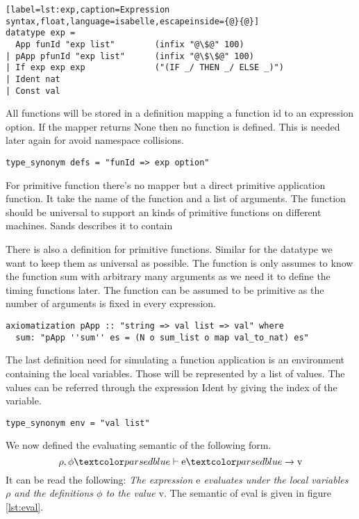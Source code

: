 \begin{lstlisting}[label=lst:exp,caption=Expression syntax,float,language=isabelle,escapeinside={@}{@}]
datatype exp =
  App funId "exp list"        (infix "@\$@" 100)
| pApp pfunId "exp list"      (infix "@\$\$@" 100)
| If exp exp exp              ("(IF _/ THEN _/ ELSE _)")
| Ident nat
| Const val
\end{lstlisting}

All functions will be stored in a definition mapping a function id to an expression option.
If the mapper returns None then no function is defined.
This is needed later again for avoid namespace collisions.
\begin{lstlisting}[mathescape=true,language=isabelle]
type_synonym defs = "funId => exp option"
\end{lstlisting}

For primitive function there's no mapper but a direct primitive application function.
It take the name of the function and a list of arguments.
The function should be universal to support an kinds of primitive functions on different machines.
Sands describes it to contain

There is also a definition for primitive functions.
Similar for the datatype we want to keep them as universal as possible.
The function is only assumes to know the function sum with arbitrary many arguments as we need it to define
the timing functions later.
The function can be assumed to be primitive as the number of arguments is fixed in every expression.
\begin{lstlisting}[mathescape=true,language=isabelle]
axiomatization pApp :: "string => val list => val" where
  sum: "pApp ''sum'' es = (N o sum_list o map val_to_nat) es"
\end{lstlisting}

The last definition need for simulating a function application is an environment containing the local variables.
Those will be represented by a list of values.
The values can be referred through the expression Ident by giving the index of the variable.
\begin{lstlisting}[language=isabelle]
type_synonym env = "val list"
\end{lstlisting}

We now defined the evaluating semantic of the following form.
\begin{equation*}
  \rho, \phi \hvdash \text{e} \hrightarrow \text{v}
\end{equation*}
It can be read the following: \textit{The expression $\text{e}$ evaluates under the local variables $\rho$ and the definitions $\phi$ to the value $\text{v}$}. The semantic of eval is given in figure \ref{lst:eval}.

